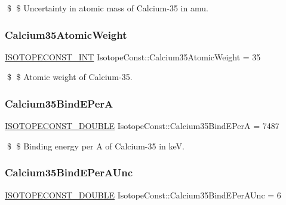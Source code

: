 \$ \$ Uncertainty in atomic mass of Calcium-\/35 in amu. \mbox{\label{group___isotope_const-_calcium-_ca35_ga54c74613138241420d7d1019b0ac0fd9}} 
\subsubsection{\texorpdfstring{Calcium35\+Atomic\+Weight}{Calcium35AtomicWeight}}
{\footnotesize\ttfamily \mbox{\hyperlink{group___isotope_const-_macros_ga5f18360b3e99483a35c32d789e62621c}{I\+S\+O\+T\+O\+P\+E\+C\+O\+N\+S\+T\+\_\+\+I\+NT}} Isotope\+Const\+::\+Calcium35\+Atomic\+Weight = 35}

\$ \$ Atomic weight of Calcium-\/35. \mbox{\label{group___isotope_const-_calcium-_ca35_gaee9e5ae343604bbd99e03436406f796d}} 
\subsubsection{\texorpdfstring{Calcium35\+Bind\+E\+PerA}{Calcium35BindEPerA}}
{\footnotesize\ttfamily \mbox{\hyperlink{group___isotope_const-_macros_ga8f45a7272ce02c0b4c65c44636ed719a}{I\+S\+O\+T\+O\+P\+E\+C\+O\+N\+S\+T\+\_\+\+D\+O\+U\+B\+LE}} Isotope\+Const\+::\+Calcium35\+Bind\+E\+PerA = 7487}

\$ \$ Binding energy per A of Calcium-\/35 in keV. \mbox{\label{group___isotope_const-_calcium-_ca35_gadc2d0fb752a93f21ef88851d6a6a54b4}} 
\subsubsection{\texorpdfstring{Calcium35\+Bind\+E\+Per\+A\+Unc}{Calcium35BindEPerAUnc}}
{\footnotesize\ttfamily \mbox{\hyperlink{group___isotope_const-_macros_ga8f45a7272ce02c0b4c65c44636ed719a}{I\+S\+O\+T\+O\+P\+E\+C\+O\+N\+S\+T\+\_\+\+D\+O\+U\+B\+LE}} Isotope\+Const\+::\+Calcium35\+Bind\+E\+Per\+A\+Unc = 6}

